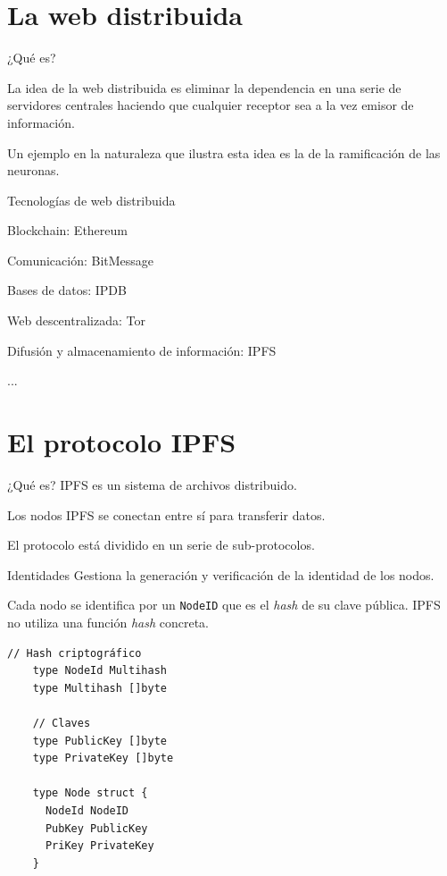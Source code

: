 \documentclass[spanish]{beamer}
\begin{document}
\section{La web distribuida} %
\label{sec:la_web_distribuida}

\begin{frame}{¿Qué es?}
  
  La idea de la web distribuida es eliminar la dependencia en una serie de servidores centrales haciendo que cualquier receptor sea a la vez emisor de información.

  Un ejemplo en la naturaleza que ilustra esta idea es la de la ramificación de las neuronas.

\end{frame}

\begin{frame}{Tecnologías de web distribuida}
  
  Blockchain: Ethereum

  Comunicación: BitMessage

  Bases de datos: IPDB

  Web descentralizada: Tor

  Difusión y almacenamiento de información: IPFS

  ...

\end{frame}


\section{El protocolo IPFS} %
\label{sec:el_protocolo_ipfs}

\begin{frame}{¿Qué es?}
  IPFS es un sistema de archivos distribuido.

  Los nodos IPFS se conectan entre sí para transferir datos.

  El protocolo está dividido en un serie de sub-protocolos.
\end{frame}

\begin{frame}[fragile]{Identidades}
  Gestiona la generación y verificación de la identidad de los nodos.

  Cada nodo se identifica por un \texttt{NodeID} que es el \textit{hash} de su clave pública. IPFS no utiliza una función \textit{hash} concreta.

  \begin{lstlisting}[caption={Definición de Nodo.}, language=Golang]
    // Hash criptográfico
    type NodeId Multihash
    type Multihash []byte
    
    // Claves
    type PublicKey []byte
    type PrivateKey []byte

    type Node struct {
      NodeId NodeID
      PubKey PublicKey
      PriKey PrivateKey
    }
  \end{lstlisting}
\end{frame}
\end{document}
